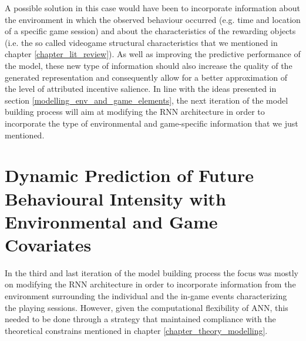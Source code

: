 A possible solution in this case would have been to incorporate information about the environment in which the observed behaviour occurred (e.g. time and location of a specific game session) and about the characteristics of the rewarding objects (i.e. the so called videogame structural characteristics that we mentioned in chapter \ref{chapter_lit_review}). As well as improving the predictive performance of the model, these new type of information should also increase the quality of the generated representation and consequently allow for a better approximation of the level of attributed incentive salience. In line with the ideas presented in section \ref{modelling_env_and_game_elements}, the next iteration of the model building process will aim at modifying the RNN architecture in order to incorporate the type of environmental and game-specific information that we just mentioned.

\section{Dynamic Prediction of Future Behavioural Intensity with Environmental and Game Covariates}
\label{model_architecture_3}
In the third and last iteration of the model building process the focus was mostly on modifying the RNN architecture in order to incorporate information from the environment surrounding the individual and the in-game events characterizing the playing sessions. However, given the computational flexibility of ANN, this needed to be done through a strategy that maintained compliance with the theoretical constrains mentioned in chapter \ref{chapter_theory_modelling}.

